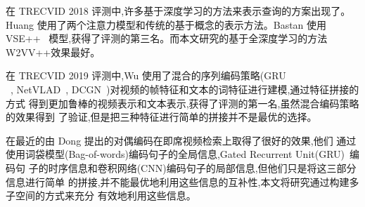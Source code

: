 在 TRECVID 2018 评测中,许多基于深度学习的方法来表示查询的方案出现了。Huang \etal\cite{huang2018informedia}使用了两个注意力模型和传统的基于概念的表示方法。Bastan \etal\cite{bastan2018ntu}使用 VSE++~\cite{faghri2017vse++}
模型,获得了评测的第三名。而本文研究的基于全深度学习的方法 W2VV++效果最好。

在 TRECVID 2019 评测中,Wu \etal\cite{wu2019hybrid}使用了混合的序列编码策略(GRU\\~\cite{cho2014learning},
NetVLAD~\cite{arandjelovic2016netvlad}, DCGN~\cite{mao2018hierarchical})对视频的帧特征和文本的词特征进行建模,通过特征拼接的方式
得到更加鲁棒的视频表示和文本表示,获得了评测的第一名,虽然混合编码策略的效果得到
了验证,但是把三种特征进行简单的拼接并不是最优的选择。

在最近的由 Dong \etal\cite{dong2019dual}提出的对偶编码在即席视频检索上取得了很好的效果,他们
通过使用词袋模型(Bag-of-words)编码句子的全局信息,Gated Recurrent Unit(GRU)~\cite{cho2014learning}编码句
子的时序信息和卷积网络(CNN)编码句子的局部信息,但他们只是将这三部分信息进行简单
的拼接,并不能最优地利用这些信息的互补性,本文将研究通过构建多子空间的方式来充分
有效地利用这些信息。

